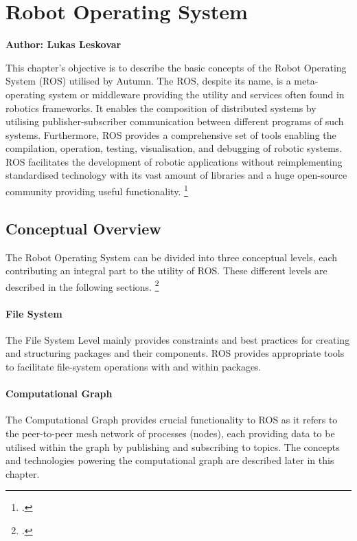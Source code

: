 \chapter{Robot Operating System}
\label{chapter:ros}

\textbf{Author: Lukas Leskovar} 

This chapter's objective is to describe the basic concepts of the Robot Operating System (ROS) utilised by Autumn. The ROS, despite its name, is a meta-operating system or middleware providing the utility and services often found in robotics frameworks. It enables the composition of distributed systems by utilising publisher-subscriber communication between different programs of such systems. Furthermore, ROS provides a comprehensive set of tools enabling the compilation, operation, testing, visualisation, and debugging of robotic systems. ROS facilitates the development of robotic applications without reimplementing standardised technology with its vast amount of libraries and a huge open-source community providing useful functionality. \footcite{openSourceRoboticsFoundationDefinitionNodate}


\section{Conceptual Overview}
The Robot Operating System can be divided into three conceptual levels, each contributing an integral part to the utility of ROS. These different levels are described in the following sections. \footcite{openSourceRoboticsFoundationConceptsNodate}

\subsubsection{File System}
The File System Level mainly provides constraints and best practices for creating and structuring packages and their components. 
ROS provides appropriate tools to facilitate file-system operations with and within packages.

\subsubsection{Computational Graph}
The Computational Graph provides crucial functionality to ROS as it refers to the peer-to-peer mesh network of processes (nodes), each providing data to be utilised within the graph by publishing and subscribing to topics.
The concepts and technologies powering the computational graph are described later in this chapter.

